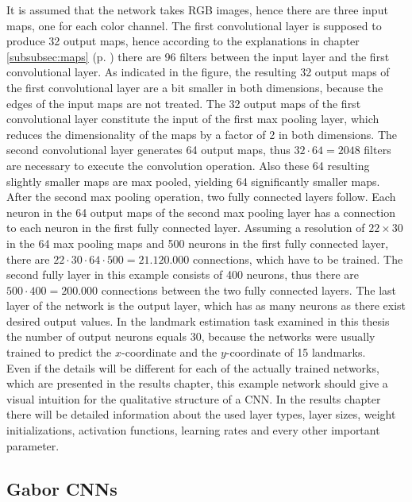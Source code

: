 \documentclass[11pt, a4paper]{article}
\newcommand\myref[1]{\ref{#1} (p. \pageref{#1})}
\begin{document}
It is assumed that the network takes \ac{RGB} images, hence there are three input maps, one for each color channel. The first convolutional layer is supposed to produce 32 output maps, hence according to the explanations in chapter \myref{subsubsec:maps} there are 96 filters between the input layer and the first convolutional layer. As indicated in the figure, the resulting 32 output maps of the first convolutional layer are a bit smaller in both dimensions, because the edges of the input maps are not treated. The 32 output maps of the first convolutional layer constitute the input of the first max pooling layer, which reduces the dimensionality of the maps by a factor of 2 in both dimensions. The second convolutional layer generates 64 output maps, thus $32 \cdot 64 = 2048$ filters are necessary to execute the convolution operation. Also these 64 resulting slightly smaller maps are max pooled, yielding 64 significantly smaller maps. After the second max pooling operation, two fully connected layers follow. Each neuron in the 64 output maps of the second max pooling layer has a connection to each neuron in the first fully connected layer. Assuming a resolution of $22\times 30$ in the 64 max pooling maps and 500 neurons in the first fully connected layer, there are $22 \cdot 30 \cdot 64 \cdot 500 = 21.120.000$ connections, which have to be trained. The second fully layer in this example consists of 400 neurons, thus there are $500 \cdot 400 = 200.000$ connections between the two fully connected layers. The last layer of the network is the output layer, which has as many neurons as there exist desired output values. In the landmark estimation task examined in this thesis the number of output neurons equals 30, because the networks were usually trained to predict the $x$-coordinate and the $y$-coordinate of 15 landmarks.\\
Even if the details will be different for each of the actually trained networks, which are presented in the results chapter, this example network should give a visual intuition for the qualitative structure of a \ac{CNN}. In the results chapter there will be detailed information about the used layer types, layer sizes, weight initializations, activation functions, learning rates and every other important parameter.

\subsection{Gabor CNNs}
\label{subsec:gaborcnns}
\end{document}
